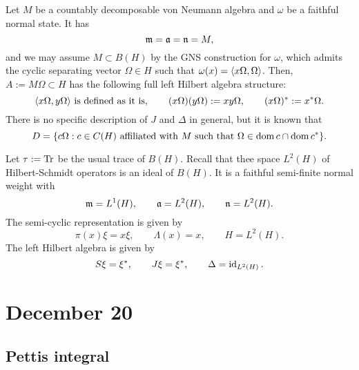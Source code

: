 \documentclass{../../../small}
\begin{document}
\begin{ex}
Let $M$ be a countably decomposable von Neumann algebra and $\omega$ be a faithful normal state.
It has
\[\mathfrak{m}=\mathfrak{a}=\mathfrak{n}=M,\]
and we may assume $M\subset B(H)$ by the GNS construction for $\omega$, which admits the cyclic separating vector $\Omega\in H$ such that $\omega(x)=\langle x\Omega,\Omega\rangle$.
Then, $A:=M\Omega\subset H$ has the following full left Hilbert algebra structure:
\[\langle x\Omega,y\Omega\rangle\text{ is defined as it is},\qquad (x\Omega)(y\Omega):=xy\Omega,\qquad (x\Omega)^*:=x^*\Omega.\]
There is no specific description of $J$ and $\Delta$ in general, but it is known that
\[D=\{c\Omega:c\in C(H)\text{ affiliated with $M$ such that }\Omega\in\operatorname{dom} c\cap\operatorname{dom} c^*\}.\]
\end{ex}


\begin{ex}[Trace of $B(H)$]
Let $\tau:=\operatorname{Tr}$ be the usual trace of $B(H)$.
Recall that thee space $L^2(H)$ of Hilbert-Schmidt operators is an ideal of $B(H)$.
It is a faithful semi-finite normal weight with
\[\mathfrak{m}=L^1(H),\qquad\mathfrak{a}=L^2(H),\qquad\mathfrak{n}=L^2(H).\]
The semi-cyclic representation is given by
\[\pi(x)\xi=x\xi,\qquad\Lambda(x)=x,\qquad H=L^2(H).\]
The left Hilbert algebra is given by
\[S\xi=\xi^*,\qquad J\xi=\xi^*,\qquad\Delta=\operatorname{id}_{L^2(H)}.\]



\end{ex}







\newpage
\section{December 20}

\subsection{Pettis integral}
\end{document}

